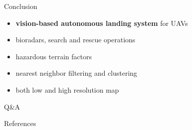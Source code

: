 \documentclass[10pt]{beamer}
\begin{document}
%

    \begin{frame}{Conclusion}
        \begin{itemize}
            \item \textbf{vision-based autonomous landing system} for UAVs
            \item bioradars, search and rescue operations
            \item hazardous terrain factors
            \item nearest neighbor filtering and clustering
            \item both low and high resolution map
        \end{itemize}
    \end{frame}

    \begin{frame}[standout]
        Q\&A
    \end{frame}

    \appendix

    \begin{frame}{References}
        
        
    \end{frame}
\end{document}
